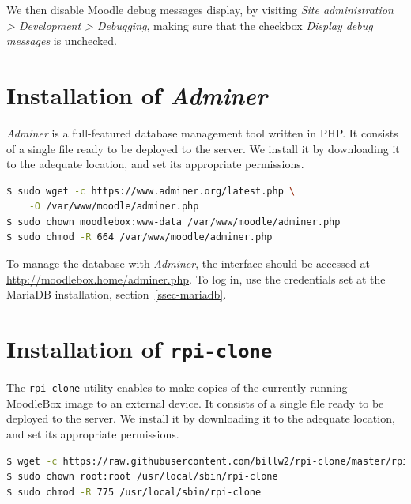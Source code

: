 \documentclass[12pt]{article}
\begin{document}
We then disable Moodle debug messages display, by visiting \emph{Site administration > Development > Debugging}, making sure that the checkbox \emph{Display debug messages} is unchecked.

\section{Installation of \textsl{Adminer}}

\textsl{Adminer} is a full-featured database management tool written in PHP.
It consists of a single file ready to be deployed to the server.
We install it by downloading it to the adequate location, and set its appropriate permissions.
\begin{lstlisting}[language=bash]
$ sudo wget -c https://www.adminer.org/latest.php \
    -O /var/www/moodle/adminer.php
$ sudo chown moodlebox:www-data /var/www/moodle/adminer.php
$ sudo chmod -R 664 /var/www/moodle/adminer.php
\end{lstlisting}

To manage the database with \textsl{Adminer}, the interface should be accessed at \url{http://moodlebox.home/adminer.php}.
To log in, use the credentials set at the MariaDB installation, section~\ref{ssec-mariadb}.

\section{Installation of \texttt{rpi-clone}}

The \texttt{rpi-clone} utility enables to make copies of the currently running MoodleBox image to an external device.
It consists of a single file ready to be deployed to the server.
We install it by downloading it to the adequate location, and set its appropriate permissions.
\begin{lstlisting}[language=bash]
$ wget -c https://raw.githubusercontent.com/billw2/rpi-clone/master/rpi-clone -O /usr/local/sbin/rpi-clone
$ sudo chown root:root /usr/local/sbin/rpi-clone
$ sudo chmod -R 775 /usr/local/sbin/rpi-clone
\end{lstlisting}
\end{document}
